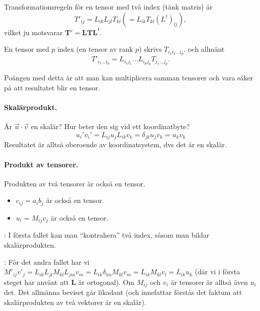 \documentclass[%
oneside,                 %
final,                   %
10pt]{article}
\newcommand{\shortinlinecomment}[3]{{\color{red}{\bf #1}: #2}}
\newcommand{\longinlinecomment}[3]{{\color{red}{\bf #1}: #2}}
\begin{document}
Transformationsregeln för en tensor med två index (tänk matris) är
\begin{equation} 
T'_{ij} = L_{ik} L_{jl} T_{kl} \left( = L_{ik} T_{kl} \left( L^t \right)_{lj} \right),
\end{equation}
vilket ju motsvarar $\mathbf{T}' = \mathbf{L} \mathbf{T} \mathbf{L}^t$.

En tensor med $p$ index (en tensor av rank $p$) skrivs $T_{i_1i_2\ldots i_p}$.  och allmänt
\begin{equation}
T'_{i_1\ldots i_p}=L_{i_1j_1}\ldots L_{i_pj_p}T_{j_1\ldots j_p}.
\end{equation}

Poängen med detta är att man kan multiplicera samman tensorer och
vara säker på att resultatet blir en tensor. 

\paragraph{Skalärprodukt.}
Är $\vec{u} \cdot \vec{v}$ en skalär? Hur beter den sig vid ett koordinatbyte?
\begin{equation}
u_i' v_i' = L_{ij} u_j L_{ik} v_k = \delta_{jk} u_j v_k = u_k v_k
\end{equation}
Resultatet är alltså oberoende av koordinatsystem, dvs det är en skalär.

\paragraph{Produkt av tensorer.}
Produkten av två tensorer är också en tensor.
\begin{itemize}
\item $c_{ij}=a_i b_j$ är också en tensor. 

\item $u_i=M_{ij}v_j$ är också en tensor. 
\end{itemize}

\noindent
\shortinlinecomment{Comment 8}{ I första fallet kan man ``kontrahera'' två index, såsom man bildar skalärprodukten. }{ I första fallet kan }

\longinlinecomment{Comment 9}{ För det andra fallet har vi $M'_{ij}v'_j=L_{ik}L_{jl}M_{kl}L_{jm}v_m=L_{ik}\delta_{lm}M_{kl}v_m=L_{ik}M_{kl}v_l =L_{ik}u_k$ (där vi i första steget har använt att $\mathbf{L}$ är ortogonal). Om $M_{ij}$ och $v_i$ är tensorer är alltså även $u_i$ det. Det allmänna beviset går likadant (och innefattar förstås det faktum att skalärprodukten av två vektorer är en skalär). }{ För det andra fallet }
\end{document}
